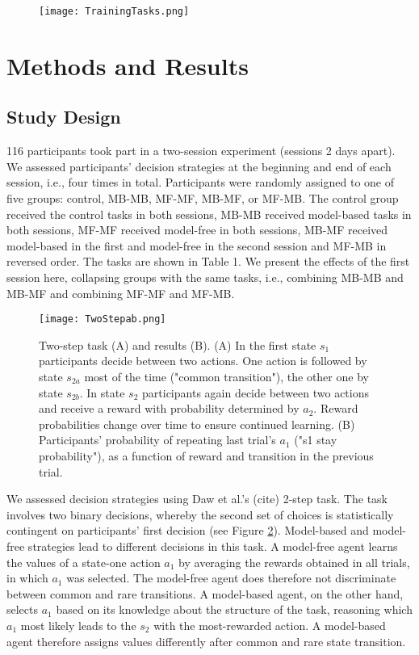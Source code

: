 \documentclass[11pt]{article} %
\begin{document}
\begin{figure}
	\texttt{[image: TrainingTasks.png]}
	\label{TrainingTasks}
\end{figure}

\section{Methods and Results}
\subsection{Study Design}

116 participants took part in a two-session experiment (sessions 2 days apart). We assessed participants' decision strategies at the beginning and end of each session, i.e., four times in total. Participants were randomly assigned to one of five groups: control, MB-MB, MF-MF, MB-MF, or MF-MB. The control group received the control tasks in both sessions, MB-MB received model-based tasks in both sessions, MF-MF received model-free in both sessions, MB-MF received model-based in the first and model-free in the second session and MF-MB in reversed order. The tasks are shown in Table 1. We present the effects of the first session here, collapsing groups with the same tasks, i.e., combining MB-MB and MB-MF and combining MF-MF and MF-MB.

\begin{figure}
	\texttt{[image: TwoStepab.png]}
	\caption{Two-step task (A) and results (B). (A) In the first state $s_{1}$ participants decide between two actions. One action is followed by state $s_{2a}$ most of the time ("common transition"), the other one by state $s_{2b}$. In state $s_{2}$ participants again decide between two actions and receive a reward with probability determined by $a_{2}$. Reward probabilities change over time to ensure continued learning. (B) Participants' probability of repeating last trial's $a_{1}$ ("s1 stay probability"), as a function of reward and transition in the previous trial.}
	\label{TwoStep}
\end{figure}

We assessed decision strategies using Daw et al.'s (cite) 2-step task. The task involves two binary decisions, whereby the second set of choices is statistically contingent on participants' first decision (see Figure \ref{TwoStep}). Model-based and model-free strategies lead to different decisions in this task. A model-free agent learns the values of a state-one action $a_{1}$ by averaging the rewards obtained in all trials, in which $a_{1}$ was selected. The model-free agent does therefore not discriminate between common and rare transitions. A model-based agent, on the other hand, selects $a_{1}$ based on its knowledge about the structure of the task, reasoning which $a_{1}$ most likely leads to the $s_{2}$ with the most-rewarded action. A model-based agent therefore assigns values differently after common and rare state transition.
\end{document}
